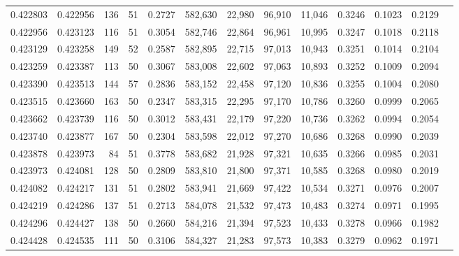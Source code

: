 \begin{tabular}{rrrrrrrrrrrrr}
0.422803 & 0.422956 &   136 &  51 &                                     0.2727 & 582,630 &  22,980 &  96,910 &  11,046 & 0.3246 & 0.1023 & 0.2129 \\
0.422956 & 0.423123 &   116 &  51 &                                     0.3054 & 582,746 &  22,864 &  96,961 &  10,995 & 0.3247 & 0.1018 & 0.2118 \\
0.423129 & 0.423258 &   149 &  52 &                                     0.2587 & 582,895 &  22,715 &  97,013 &  10,943 & 0.3251 & 0.1014 & 0.2104 \\
0.423259 & 0.423387 &   113 &  50 &                                     0.3067 & 583,008 &  22,602 &  97,063 &  10,893 & 0.3252 & 0.1009 & 0.2094 \\
0.423390 & 0.423513 &   144 &  57 &                                     0.2836 & 583,152 &  22,458 &  97,120 &  10,836 & 0.3255 & 0.1004 & 0.2080 \\
0.423515 & 0.423660 &   163 &  50 &                                     0.2347 & 583,315 &  22,295 &  97,170 &  10,786 & 0.3260 & 0.0999 & 0.2065 \\
0.423662 & 0.423739 &   116 &  50 &                                     0.3012 & 583,431 &  22,179 &  97,220 &  10,736 & 0.3262 & 0.0994 & 0.2054 \\
0.423740 & 0.423877 &   167 &  50 &                                     0.2304 & 583,598 &  22,012 &  97,270 &  10,686 & 0.3268 & 0.0990 & 0.2039 \\
0.423878 & 0.423973 &    84 &  51 &                                     0.3778 & 583,682 &  21,928 &  97,321 &  10,635 & 0.3266 & 0.0985 & 0.2031 \\
0.423973 & 0.424081 &   128 &  50 &                                     0.2809 & 583,810 &  21,800 &  97,371 &  10,585 & 0.3268 & 0.0980 & 0.2019 \\
0.424082 & 0.424217 &   131 &  51 &                                     0.2802 & 583,941 &  21,669 &  97,422 &  10,534 & 0.3271 & 0.0976 & 0.2007 \\
0.424219 & 0.424286 &   137 &  51 &                                     0.2713 & 584,078 &  21,532 &  97,473 &  10,483 & 0.3274 & 0.0971 & 0.1995 \\
0.424296 & 0.424427 &   138 &  50 &                                     0.2660 & 584,216 &  21,394 &  97,523 &  10,433 & 0.3278 & 0.0966 & 0.1982 \\
0.424428 & 0.424535 &   111 &  50 &                                     0.3106 & 584,327 &  21,283 &  97,573 &  10,383 & 0.3279 & 0.0962 & 0.1971 \\

\end{tabular}
